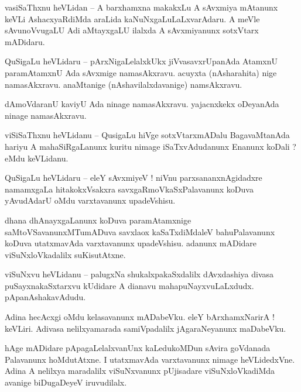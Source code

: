 \documentclass{article}
\begin{document}
\begin{mn}%
vasiSaThxnu heVLidan -- A barxhamxna makakxLu A sAvxmiya mAtanunx keVLi AshacxyaRdiMda araLida 
kaNuNxgaLuLaLxvarAdaru. A meVle sAvunoVvugaLU Adi aMtayxgaLU ilalxda A sAvxmiyanunx sotxVtarx 
mADidaru.
\end{mn}

\begin{mn}%
QuSigaLu heVLidaru -- pArxNigaLelalxkUkx jiVvasavxrUpanAda AtamxnU paramAtamxnU Ada sAvxmige 
namasAkxravu. acuyxta (nAsharahita) nige namasAkxravu. anaMtanige (nAshavilalxdavanige) namsAkxravu.
\end{mn}

\begin{mn}%
dAmoVdaranU kaviyU Ada ninage namasAkxravu. yajacnxkekx oDeyanAda ninage namasAkxravu.
\end{mn}

\begin{mn}%
viSiSaThxnu heVLidanu -- QusigaLu hiVge sotxVtarxmADalu BagavaMtanAda hariyu A mahaSiRgaLanunx 
kuritu nimage iSaTxvAdudanunx Enanunx koDali ? eMdu keVLidanu.
\end{mn}

\begin{mn}%
QuSigaLu heVLidaru -- eleY sAvxmiyeV ! niVnu parxsananxnAgidadxre namamxgaLa hitakokxVsakxra 
savxgaRmoVkaSxPalavanunx koDuva yAvudAdarU oMdu varxtavanunx upadeVshisu.
\end{mn}

\begin{mn}%
dhana dhAnayxgaLanunx koDuva paramAtamxnige saMtoVSavanunxMTumADuva savxlaox kaSaTxdiMdaleV 
bahuPalavanunx koDuva utatxmavAda varxtavanunx upadeVshisu. adanunx mADidare viSuNxloVkadalilx 
suKisutAtxne.
\end{mn}

\begin{mn}%
viSuNxvu heVLidanu -- palugxNa shukalxpakaSxdalilx dAvxdashiya divasa puSayxnakaSxtarxvu kUdidare A 
dianavu mahapuNayxvuLaLxdudx. pApanAshakavAdudu.
\end{mn}

\begin{mn}%
Adina hecAcxgi oMdu kelasavanunx mADabeVku. eleY bArxhamxNarirA ! keVLiri. Adivasa nelilxyamarada 
samiVpadalilx jAgaraNeyanunx maDabeVku.
\end{mn}

\begin{mn}%
hAge mADidare pApagaLelalxvanUnx kaLedukoMDun sAvira goVdanada Palavanunx hoMdutAtxne. I 
utatxmavAda varxtavanunx nimage heVLidedxVne. Adina A nelilxya maradalilx viSuNxvanunx pUjisadare 
viSuNxloVkadiMda avanige biDugaDeyeV iruvudilalx.
\end{mn}
\end{document}
